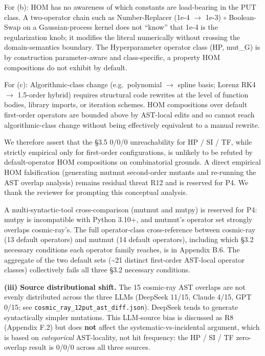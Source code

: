 \documentclass[review,12pt,authoryear]{elsarticle}
\begin{document}
For (b): HOM has no awareness of which constants are load-bearing in the
PUT class. A two-operator chain such as Number-Replacer (1e-4 $\to$ 1e-3) $\circ$
Boolean-Swap on a Gaussian-process kernel does not ``know'' that 1e-4 is
the regularization knob; it modifies the literal numerically without
crossing the domain-semantics boundary. The Hyperparameter operator
class (HP, mut\_G) is by construction parameter-aware and
class-specific, a property HOM compositions do not exhibit by default.

For (c): Algorithmic-class change (e.g.~polynomial $\to$ spline basis;
Lorenz RK4 $\to$ 1.5-order hybrid) requires structural code rewrites at the
level of function bodies, library imports, or iteration schemes. HOM
compositions over default first-order operators are bounded above by
AST-local edits and so cannot reach algorithmic-class change without
being effectively equivalent to a manual rewrite.

We therefore assert that the §3.5 0/0/0 unreachability for HP / SI / TF,
while strictly empirical only for first-order configurations, is
unlikely to be refuted by default-operator HOM compositions on
combinatorial grounds. A direct empirical HOM falsification (generating
mutmut second-order mutants and re-running the AST overlap analysis)
remains residual threat R12 and is reserved for P4. We thank the
reviewer for prompting this conceptual analysis.

A multi-syntactic-tool cross-comparison (mutmut and mutpy) is reserved
for P4: mutpy is incompatible with Python 3.10+, and mutmut's operator
set strongly overlaps cosmic-ray's. The full operator-class
cross-reference between cosmic-ray (13 default operators) and mutmut (14
default operators), including which §3.2 necessary conditions each
operator family reaches, is in Appendix B.6. The aggregate of the two
default sets (\textasciitilde21 distinct first-order AST-local operator
classes) collectively fails all three §3.2 necessary conditions.

\textbf{(iii) Source distributional shift.} The 15 cosmic-ray AST
overlaps are not evenly distributed across the three LLMs (DeepSeek
11/15, Claude 4/15, GPT 0/15; see
\texttt{cosmic\_ray\_12put\_ast\_diff.json}). DeepSeek tends to generate
syntactically simpler mutations. This LLM-source bias is discussed as R8
(Appendix F.2) but does \textbf{not} affect the systematic-vs-incidental
argument, which is based on \emph{categorical} AST-locality, not hit
frequency: the HP / SI / TF zero-overlap result is 0/0/0 across all
three sources.
\end{document}
